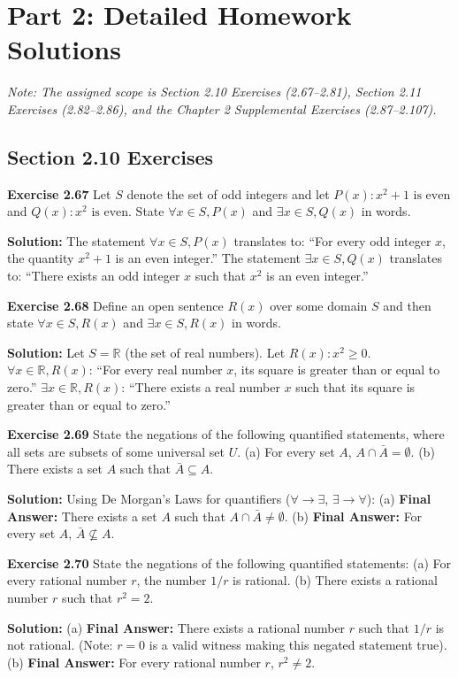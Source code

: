 \documentclass[12pt]{article}
\begin{document}
\newpage
\section{Part 2: Detailed Homework Solutions}
\textit{Note: The assigned scope is Section 2.10 Exercises (2.67--2.81), Section 2.11 Exercises (2.82--2.86), and the Chapter 2 Supplemental Exercises (2.87--2.107).}

\subsection{Section 2.10 Exercises}

\textbf{Exercise 2.67}
Let $S$ denote the set of odd integers and let $P(x): x^2 + 1 \text{ is even}$ and $Q(x): x^2 \text{ is even}$. State $\forall x \in S, P(x)$ and $\exists x \in S, Q(x)$ in words.
\begin{mdframed}
\textbf{Solution:} 
The statement $\forall x \in S, P(x)$ translates to: ``For every odd integer $x$, the quantity $x^2+1$ is an even integer.'' 
The statement $\exists x \in S, Q(x)$ translates to: ``There exists an odd integer $x$ such that $x^2$ is an even integer.''
\end{mdframed}

\textbf{Exercise 2.68}
Define an open sentence $R(x)$ over some domain $S$ and then state $\forall x \in S, R(x)$ and $\exists x \in S, R(x)$ in words.
\begin{mdframed}
\textbf{Solution:}
Let $S = \mathbb{R}$ (the set of real numbers). Let $R(x): x^2 \ge 0$.
$\forall x \in \mathbb{R}, R(x)$: ``For every real number $x$, its square is greater than or equal to zero.''
$\exists x \in \mathbb{R}, R(x)$: ``There exists a real number $x$ such that its square is greater than or equal to zero.''
\end{mdframed}

\textbf{Exercise 2.69}
State the negations of the following quantified statements, where all sets are subsets of some universal set $U$.
(a) For every set $A$, $A \cap \bar{A} = \emptyset$. 
(b) There exists a set $A$ such that $\bar{A} \subseteq A$.
\begin{mdframed}
\textbf{Solution:}
Using De Morgan's Laws for quantifiers ($\forall \to \exists$, $\exists \to \forall$):
(a) \textbf{Final Answer:} There exists a set $A$ such that $A \cap \bar{A} \neq \emptyset$.
(b) \textbf{Final Answer:} For every set $A$, $\bar{A} \not\subseteq A$.
\end{mdframed}

\textbf{Exercise 2.70}
State the negations of the following quantified statements:
(a) For every rational number $r$, the number $1/r$ is rational.
(b) There exists a rational number $r$ such that $r^2 = 2$.
\begin{mdframed}
\textbf{Solution:}
(a) \textbf{Final Answer:} There exists a rational number $r$ such that $1/r$ is not rational. (Note: $r=0$ is a valid witness making this negated statement true).
(b) \textbf{Final Answer:} For every rational number $r$, $r^2 \neq 2$.
\end{mdframed}
\end{document}
